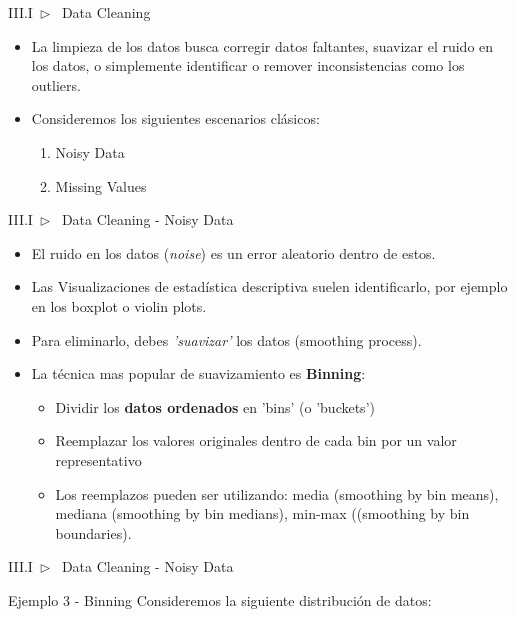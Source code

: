 \documentclass[xcolor=dvipsnames]{beamer}
\begin{document}
    \begin{frame}{III.I~$\rhd$~ Data Cleaning}
        \begin{itemize}
            \item La limpieza de los datos busca corregir datos faltantes, suavizar el ruido en los datos, o simplemente identificar o remover inconsistencias como los outliers.
            \vspace{5mm}%
            \item Consideremos los siguientes escenarios clásicos:
            \begin{enumerate}
                \item Noisy Data
                \item Missing Values
            \end{enumerate}
        \end{itemize}
    \end{frame}

    \begin{frame}{III.I~$\rhd$~ Data Cleaning - Noisy Data}
        \begin{itemize}
            \item El ruido en los datos (\textit{noise}) es un error aleatorio dentro de estos.
            \item Las Visualizaciones de estadística descriptiva suelen identificarlo, por ejemplo en los boxplot o violin plots.
            \item Para eliminarlo, debes \textit{'suavizar'} los datos (smoothing process).
            \vspace{4mm}%
            \item La técnica mas popular de suavizamiento es \textbf{Binning}:
            \begin{itemize}
                \item Dividir los \textbf{datos ordenados} en 'bins' (o 'buckets')
                \item Reemplazar los valores originales dentro de cada bin por un valor representativo
                \item Los reemplazos pueden ser utilizando: media (smoothing by bin means), mediana (smoothing by bin medians), min-max ((smoothing by bin boundaries).
            \end{itemize}
        \end{itemize}
    \end{frame}

    \begin{frame}{III.I~$\rhd$~ Data Cleaning - Noisy Data}
        \begin{exampleblock}{Ejemplo 3 - Binning}
        Consideremos la siguiente distribución de datos:
        
        \end{exampleblock}
    \end{frame}
\end{document}
